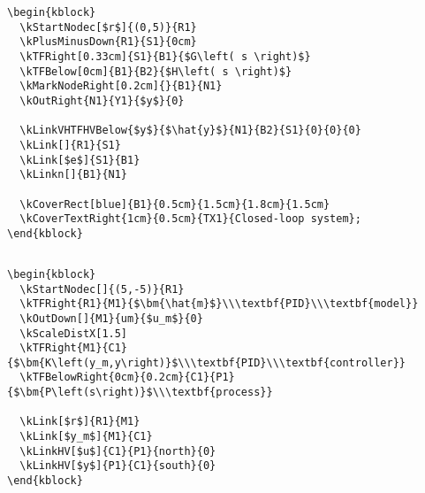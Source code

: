 \documentclass[onecolumn,a4paper,10pt]{IEEEtran}
\newcommand*{\spacetweak}{\medskip\medskip}
\begin{document}
\begin{lstlisting}
\begin{kblock}
  \kStartNodec[$r$]{(0,5)}{R1}
  \kPlusMinusDown{R1}{S1}{0cm}
  \kTFRight[0.33cm]{S1}{B1}{$G\left( s \right)$}
  \kTFBelow[0cm]{B1}{B2}{$H\left( s \right)$}
  \kMarkNodeRight[0.2cm]{}{B1}{N1}
  \kOutRight{N1}{Y1}{$y$}{0}

  \kLinkVHTFHVBelow{$y$}{$\hat{y}$}{N1}{B2}{S1}{0}{0}{0}
  \kLink[]{R1}{S1}
  \kLink[$e$]{S1}{B1}
  \kLinkn[]{B1}{N1}

  \kCoverRect[blue]{B1}{0.5cm}{1.5cm}{1.8cm}{1.5cm}
  \kCoverTextRight{1cm}{0.5cm}{TX1}{Closed-loop system};
\end{kblock}
\end{lstlisting}
\spacetweak

\subsection{}\spacetweak

\begin{kblock}
  \kScaleDistX[1.5]

\end{kblock}

\begin{lstlisting}
\begin{kblock}
  \kStartNodec[]{(5,-5)}{R1}
  \kTFRight{R1}{M1}{$\bm{\hat{m}$}\\\textbf{PID}\\\textbf{model}}
  \kOutDown[]{M1}{um}{$u_m$}{0}
  \kScaleDistX[1.5]
  \kTFRight{M1}{C1}{$\bm{K\left(y_m,y\right)}$\\\textbf{PID}\\\textbf{controller}}
  \kTFBelowRight{0cm}{0.2cm}{C1}{P1}{$\bm{P\left(s\right)}$\\\textbf{process}}

  \kLink[$r$]{R1}{M1}
  \kLink[$y_m$]{M1}{C1}
  \kLinkHV[$u$]{C1}{P1}{north}{0}
  \kLinkHV[$y$]{P1}{C1}{south}{0}
\end{kblock}
\end{lstlisting}
\spacetweak
\end{document}
